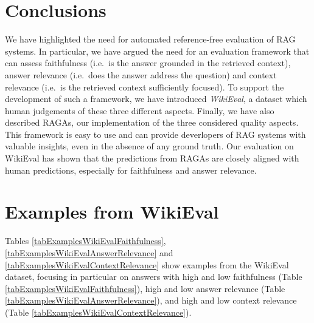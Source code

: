 \documentclass[11pt]{article}
\newcommand{\red}[1]{\textcolor{red}{#1}}
\newcommand{\todo}[1]{\red{\textsc{todo:} #1}}
\begin{document}


\section{Conclusions}
We have highlighted the need for automated reference-free evaluation of RAG systems. In particular, we have argued the need for an evaluation framework that can assess faithfulness (i.e.\ is the answer grounded in the retrieved context), answer relevance (i.e.\ does the answer address the question) and context relevance (i.e.\ is the retrieved context sufficiently focused). To support the development of such a framework, we have introduced \textit{WikiEval}, a dataset which human judgements of these three different aspects. Finally, we have also described RAGAs, our implementation of the three considered quality aspects. This framework is easy to use and can provide deverlopers of RAG systems with valuable insights, even in the absence of any ground truth. Our evaluation on WikiEval has shown that the predictions from RAGAs are closely aligned with human predictions, especially for faithfulness and answer relevance. 







\appendix


\section{Examples from WikiEval}
Tables \ref{tabExamplesWikiEvalFaithfulness}, \ref{tabExamplesWikiEvalAnswerRelevance} and \ref{tabExamplesWikiEvalContextRelevance} show examples from the WikiEval dataset, focusing in particular on answers with high and low faithfulness (Table \ref{tabExamplesWikiEvalFaithfulness}), high and low answer relevance (Table \ref{tabExamplesWikiEvalAnswerRelevance}), and high and low context relevance (Table \ref{tabExamplesWikiEvalContextRelevance}).
\end{document}

